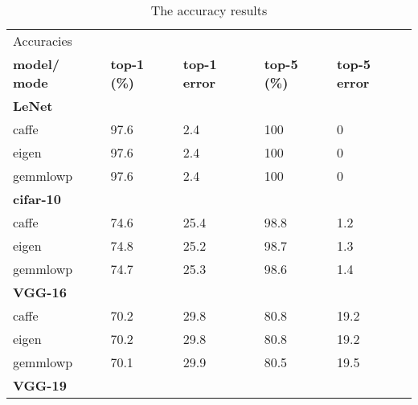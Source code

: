 \begin{table}[]
\centering
\caption[Accuracy results]{The accuracy results}
\label{tbl:accuracies}
\begin{tabular}{lllll}
\multicolumn{5}{l}{Accuracies}                                                                                                   \\
\textbf{model/ mode} & \textbf{top-1 (\%)} & \textbf{top-1 error} & \textbf{top-5 (\%)} & \textbf{top-5 error} \\
\multicolumn{5}{l}{\textbf{LeNet}}                                                                                               \\
caffe                & 97.6                         & 2.4                  & 100                          & 0                    \\
eigen                & 97.6                         & 2.4                  & 100                          & 0                    \\
gemmlowp             & 97.6                         & 2.4                  & 100                          & 0                    \\
\multicolumn{5}{l}{\textbf{cifar-10}}                                                                                            \\
caffe                & 74.6                         & 25.4                 & 98.8                         & 1.2                  \\
eigen                & 74.8                         & 25.2                 & 98.7                         & 1.3                  \\
gemmlowp             & 74.7                         & 25.3                 & 98.6                         & 1.4                  \\
\multicolumn{5}{l}{\textbf{VGG-16}}                                                                                              \\
caffe                & 70.2                         & 29.8                 & 80.8                         & 19.2                 \\
eigen                & 70.2                         & 29.8                 & 80.8                         & 19.2                 \\
gemmlowp             & 70.1                         & 29.9                 & 80.5                         & 19.5                 \\
\multicolumn{5}{l}{\textbf{VGG-19}}                                                                                              \\

\end{tabular}
\end{table}
